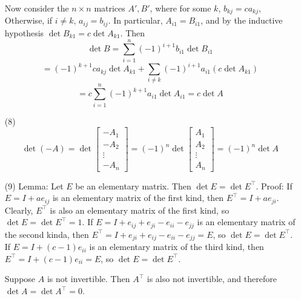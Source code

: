 \documentclass[12pt]{article}
\begin{document}
\begin{itemize}
Now consider the $n \times n$ matrices $A', B'$, where for some $k$, $b_{kj} = ca_{kj}$, Otherwise, if $i \neq k$, $a_{ij} = b_{ij}$. In particular, $A_{i1} = B_{i1}$, and by the inductive hypothesis $\det B_{k1} = c\det A_{k1}$. Then
$$\det B = \sum_{i=1}^n (-1)^{i+1}b_{i1}\det B_{i1}$$
$$= (-1)^{k+1}ca_{kj}\det A_{k1} + \sum_{i \neq k}(-1)^{i + 1}a_{i1}(c\det A_{k1})$$ 
$$= c\sum_{i=1}^n (-1)^{k+1}a_{i1}\det A_{i1} = c\det A$$
\item[(8)]
$$\det(-A) = \det\begin{bmatrix}
-A_1 \\
\hline
-A_2 \\
\hline
\vdots \\
\hline
-A_n
\end{bmatrix} = (-1)^n\det\begin{bmatrix}
A_1 \\
\hline
A_2 \\
\hline
\vdots \\
\hline
A_n
\end{bmatrix} = (-1)^{n}\det A$$
\item[(9)]
Lemma: Let $E$ be an elementary matrix. Then $\det E = \det E^\top$. Proof: If $E = I + ae_{ij}$ is an elementary matrix of the first kind, then $E^\top = I + ae_{ji}$. Clearly, $E^\top$ is also an elementary matrix of the first kind, so $\det E = \det E^\top = 1$. If $E = I + e_{ij} + e_{ji} - e_{ii} - e_{jj}$ is an elementary matrix of the second kinda, then $E^\top = I + e_{ji} + e_{ij} - e_{ii} - e_{jj} = E$, so $\det E = \det E^\top$. If $E = I + (c - 1)e_{ii}$ is an elementary matrix of the third kind, then $E^\top = I +  (c - 1)e_{ii} = E$, so $\det E = \det E^\top$. 

Suppose $A$ is not invertible. Then $A^\top$ is also not invertible, and therefore $\det A = \det A^\top = 0$.


\end{itemize}
\end{document}
